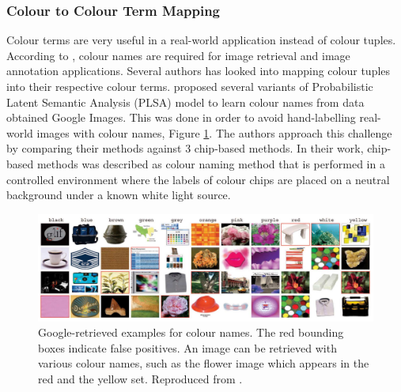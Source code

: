 \subsubsection{Colour to Colour Term Mapping}

Colour terms are very useful in a real-world application instead of colour tuples. According to \cite{van2009learning}, colour names are required for image retrieval and image annotation applications. 
Several authors has looked into mapping colour tuples into their respective colour terms.  proposed several variants of Probabilistic Latent Semantic Analysis (PLSA) model to learn colour names from data obtained Google Images. 
This was done in order to avoid hand-labelling real-world images with colour names, Figure \ref{fig:van20091}. The authors approach this challenge by comparing their methods against 3 chip-based methods. 
In their work, chip-based methods was described as colour naming method that is performed in a controlled environment where the labels of colour chips are placed on a neutral background under a known white light source.

\begin{figure}[hbt!]\centering
\includegraphics[width=1\textwidth]{image/lit/van20091.PNG}
\caption[Google-retrieved examples for colour names. The red bounding boxes indicate false positives. An image can be retrieved with various colour names, such as the flower image which appears in the red and the yellow set.]{Google-retrieved examples for colour names. The red bounding boxes indicate false positives. An image can be retrieved with various colour names, such as the flower image which appears in the red and the yellow set.  Reproduced from .}
\label{fig:van20091}
\end{figure}

